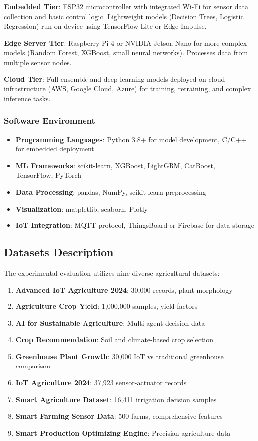 \documentclass[conference]{IEEEtran}
\begin{document}
\textbf{Embedded Tier}: ESP32 microcontroller with integrated Wi-Fi for sensor data collection and basic control logic. Lightweight models (Decision Trees, Logistic Regression) run on-device using TensorFlow Lite or Edge Impulse.

\textbf{Edge Server Tier}: Raspberry Pi 4 or NVIDIA Jetson Nano for more complex models (Random Forest, XGBoost, small neural networks). Processes data from multiple sensor nodes.

\textbf{Cloud Tier}: Full ensemble and deep learning models deployed on cloud infrastructure (AWS, Google Cloud, Azure) for training, retraining, and complex inference tasks.

\subsubsection{Software Environment}
\begin{itemize}
\item \textbf{Programming Languages}: Python 3.8+ for model development, C/C++ for embedded deployment
\item \textbf{ML Frameworks}: scikit-learn, XGBoost, LightGBM, CatBoost, TensorFlow, PyTorch
\item \textbf{Data Processing}: pandas, NumPy, scikit-learn preprocessing
\item \textbf{Visualization}: matplotlib, seaborn, Plotly
\item \textbf{IoT Integration}: MQTT protocol, ThingsBoard or Firebase for data storage
\end{itemize}

\subsection{Datasets Description}

The experimental evaluation utilizes nine diverse agricultural datasets:

\begin{enumerate}
\item \textbf{Advanced IoT Agriculture 2024}: 30,000 records, plant morphology
\item \textbf{Agriculture Crop Yield}: 1,000,000 samples, yield factors
\item \textbf{AI for Sustainable Agriculture}: Multi-agent decision data
\item \textbf{Crop Recommendation}: Soil and climate-based crop selection
\item \textbf{Greenhouse Plant Growth}: 30,000 IoT vs traditional greenhouse comparison
\item \textbf{IoT Agriculture 2024}: 37,923 sensor-actuator records
\item \textbf{Smart Agriculture Dataset}: 16,411 irrigation decision samples
\item \textbf{Smart Farming Sensor Data}: 500 farms, comprehensive features
\item \textbf{Smart Production Optimizing Engine}: Precision agriculture data
\end{enumerate}
\end{document}
